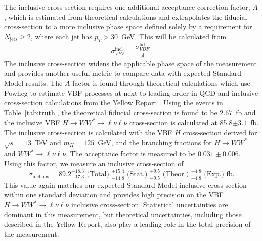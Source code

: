 The inclusive cross-section requires one additional acceptance correction factor, $A$, which is estimated from theoretical calculations and extrapolates the fiducial cross-section to a more inclusive phase space defined solely by a requirement for $N_{\text{jets}}\geq2$, where each jet has $p_T>30$~GeV. This will be calculated from
\begin{equation}
\sigma_{VBF}^{\text{incl}} = \frac{\sigma_{VBF}^{\text{fid}}}{A}.
\end{equation}
The inclusive cross-section widens the applicable phase space of the measurement and provides another useful metric to compare data with expected Standard Model results. The $A$ factor is found through theoretical calculations which use Powheg to estimate VBF processes at next-to-leading order in QCD and inclusive cross-section calculations from the Yellow Report \cite{LHCCrossSectionWG}. Using the events in Table~\ref{tab:truth}, the theoretical fiducial cross-section is found to be $2.67$~fb and the inclusive VBF $H\rightarrow WW^*\rightarrow \ell\nu\ell\nu$ cross-section is calculated at 85.8$\pm 3.1$~fb. The inclusive cross-section is calculated with the VBF $H$ cross-section derived for $\sqrt{s}=13$~TeV and $m_H=125$~GeV, and the branching fractions for $H\rightarrow WW^*$ and $WW^*\rightarrow\ell\nu\ell\nu$.  The acceptance factor is measured to be $0.031 \pm 0.006$. Using this factor, we measure an inclusive cross-section of
\begin{equation}
\sigma_{\text{incl,obs}} = 89.2^{+18.3}_{-17.3} \text{ (Total) } ^{+15.4}_{-14.8} \text{ (Stat.) } ^{+9.5}_{-9.5} \text{ (Theor.) } ^{+4.8}_{-4.8} \text{ (Exp.)} \text{ fb}.
\end{equation} 
This value again matches our expected Standard Model inclusive cross-section within one standard deviation and provides high precision on the VBF $H\rightarrow WW^*\rightarrow\ell\nu\ell\nu$ inclusive cross-section. Statistical uncertainties are dominant in this measurement, but theoretical uncertainties, including those described in the Yellow Report, also play a leading role in the total precision of the measurement.   
